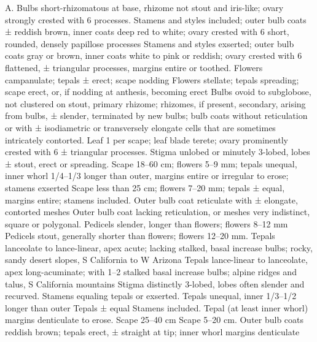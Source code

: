 \documentclass[a4paper]{article}
\begin{document}
\begin{Key}{A. }
\alter Bulbs short-rhizomatous at base, rhizome not stout and iris-like; ovary strongly crested with 6 processes.
\alter Stamens and styles included; outer bulb coats ± reddish brown, inner coats deep red to white; ovary crested with 6 short, rounded, densely papillose processes
\alter Stamens and styles exserted; outer bulb coats gray or brown, inner coats white to pink or reddish; ovary crested with 6 flattened, ± triangular processes, margins entire or toothed.
\alter Flowers campanulate; tepals ± erect; scape nodding
\alter Flowers stellate; tepals spreading; scape erect, or, if nodding at anthesis, becoming erect
\alter Bulbs ovoid to subglobose, not clustered on stout, primary rhizome; rhizomes, if present, secondary, arising from bulbs, ± slender, terminated by new bulbs; bulb coats without reticulation or with ± isodiametric or transversely elongate cells that are sometimes intricately contorted.
\alter Leaf 1 per scape; leaf blade terete; ovary prominently crested with 6 ± triangular processes.
\alter Stigma unlobed or minutely 3-lobed, lobes ± stout, erect or spreading.
\alter Scape 18--60 cm; flowers 5--9 mm; tepals unequal, inner whorl 1/4--1/3 longer than outer, margins entire or irregular to erose; stamens exserted
\alter Scape less than 25 cm; flowers 7--20 mm; tepals ± equal, margins entire; stamens included.
\alter Outer bulb coat reticulate with ± elongate, contorted meshes
\alter Outer bulb coat lacking reticulation, or meshes very indistinct, square or polygonal.
\alter Pedicels slender, longer than flowers; flowers 8--12 mm
\alter Pedicels stout, generally shorter than flowers; flowers 12--20 mm.
\alter Tepals lanceolate to lance-linear, apex acute; lacking stalked, basal increase bulbs; rocky, sandy desert slopes, S California to W Arizona
\alter Tepals lance-linear to lanceolate, apex long-acuminate; with 1--2 stalked basal increase bulbs; alpine ridges and talus, S California mountains
\alter Stigma distinctly 3-lobed, lobes often slender and recurved.
\alter Stamens equaling tepals or exserted.
\alter Tepals unequal, inner 1/3--1/2 longer than outer
\alter Tepals ± equal
\alter Stamens included.
\alter Tepal (at least inner whorl) margins denticulate to erose.
\alter Scape 25--40 cm
\alter Scape 5--20 cm.
\alter Outer bulb coats reddish brown; tepals erect, ± straight at tip; inner whorl margins denticulate

\end{Key}
\end{document}
